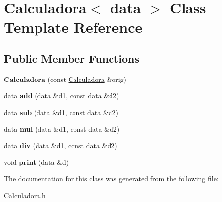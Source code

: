 \hypertarget{class_calculadora}{}\section{Calculadora$<$ data $>$ Class Template Reference}
\label{class_calculadora}
\subsection*{Public Member Functions}
\begin{DoxyCompactItemize}
\item 
\hypertarget{class_calculadora_a878963f2a1b0c9c586c3872158a25267}{}\label{class_calculadora_a878963f2a1b0c9c586c3872158a25267} 
{\bfseries Calculadora} (const \hyperlink{class_calculadora}{Calculadora} \&orig)
\item 
\hypertarget{class_calculadora_a05dcd61b28120faedfb6dbbd65463af6}{}\label{class_calculadora_a05dcd61b28120faedfb6dbbd65463af6} 
data {\bfseries add} (data \&d1, const data \&d2)
\item 
\hypertarget{class_calculadora_aec3d8e1acaa2b0268c0b07d7154d0e40}{}\label{class_calculadora_aec3d8e1acaa2b0268c0b07d7154d0e40} 
data {\bfseries sub} (data \&d1, const data \&d2)
\item 
\hypertarget{class_calculadora_aa032b0fd70acc7307e9a54d028e9a5b4}{}\label{class_calculadora_aa032b0fd70acc7307e9a54d028e9a5b4} 
data {\bfseries mul} (data \&d1, const data \&d2)
\item 
\hypertarget{class_calculadora_a4b7c80675555ce2ad393d6572634672b}{}\label{class_calculadora_a4b7c80675555ce2ad393d6572634672b} 
data {\bfseries div} (data \&d1, const data \&d2)
\item 
\hypertarget{class_calculadora_a49ad8020c1eae50b024b5fa3ba89a38d}{}\label{class_calculadora_a49ad8020c1eae50b024b5fa3ba89a38d} 
void {\bfseries print} (data \&d)
\end{DoxyCompactItemize}


The documentation for this class was generated from the following file\+:\begin{DoxyCompactItemize}
\item 
Calculadora.\+h\end{DoxyCompactItemize}
